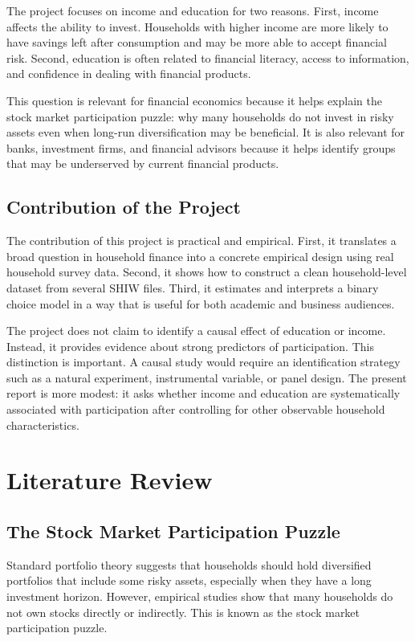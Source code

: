 \documentclass[12pt]{article}
\begin{document}
The project focuses on income and education for two reasons. First, income affects the ability to invest. Households with higher income are more likely to have savings left after consumption and may be more able to accept financial risk. Second, education is often related to financial literacy, access to information, and confidence in dealing with financial products.

This question is relevant for financial economics because it helps explain the stock market participation puzzle: why many households do not invest in risky assets even when long-run diversification may be beneficial. It is also relevant for banks, investment firms, and financial advisors because it helps identify groups that may be underserved by current financial products.

\subsection{Contribution of the Project}

The contribution of this project is practical and empirical. First, it translates a broad question in household finance into a concrete empirical design using real household survey data. Second, it shows how to construct a clean household-level dataset from several SHIW files. Third, it estimates and interprets a binary choice model in a way that is useful for both academic and business audiences.

The project does not claim to identify a causal effect of education or income. Instead, it provides evidence about strong predictors of participation. This distinction is important. A causal study would require an identification strategy such as a natural experiment, instrumental variable, or panel design. The present report is more modest: it asks whether income and education are systematically associated with participation after controlling for other observable household characteristics.

\section{Literature Review}

\subsection{The Stock Market Participation Puzzle}

Standard portfolio theory suggests that households should hold diversified portfolios that include some risky assets, especially when they have a long investment horizon. However, empirical studies show that many households do not own stocks directly or indirectly. This is known as the stock market participation puzzle.
\end{document}

